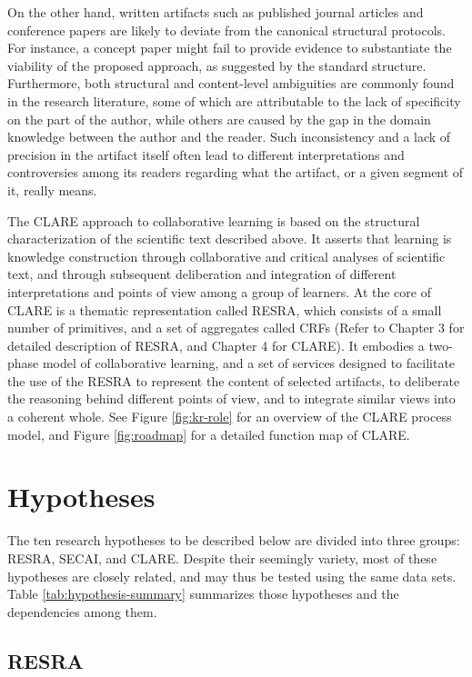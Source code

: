 On the other hand, written artifacts such as published journal articles and
conference papers are likely to deviate from the canonical structural
protocols. For instance, a concept paper might fail to provide evidence to
substantiate the viability of the proposed approach, as suggested by the
standard structure.  Furthermore, both structural and content-level
ambiguities are commonly found in the research literature, some of which
are attributable to the lack of specificity on the part of the author,
while others are caused by the gap in the domain knowledge between the
author and the reader. Such inconsistency and a lack of precision in the
artifact itself often lead to different interpretations and controversies
among its readers regarding what the artifact, or a given segment of it,
really means.

The CLARE approach to collaborative learning is based on the structural
characterization of the scientific text described above. It asserts that
learning is knowledge construction through collaborative and critical
analyses of scientific text, and through subsequent deliberation and
integration of different interpretations and points of view among a group
of learners. At the core of CLARE is a thematic representation called
RESRA, which consists of a small number of primitives, and a set of
aggregates called CRFs (Refer to Chapter 3 for detailed description of
RESRA, and Chapter 4 for CLARE). It embodies a two-phase model of
collaborative learning, and a set of services designed to facilitate the
use of the RESRA to represent the content of selected artifacts, to
deliberate the reasoning behind different points of view, and to integrate
similar views into a coherent whole. See Figure \ref{fig:kr-role} for an
overview of the CLARE process model, and Figure \ref{fig:roadmap} for a
detailed function map of CLARE.


\section{Hypotheses}
\label{sec:hypothesis}

The ten research hypotheses to be described below are divided into three
groups: RESRA, SECAI, and CLARE. Despite their seemingly variety, most of
these hypotheses are closely related, and may thus be tested using the same
data sets. Table \ref{tab:hypothesis-summary} summarizes those hypotheses
and the dependencies among them.

\subsection{RESRA}
\label{sec:resra hypothesis}


